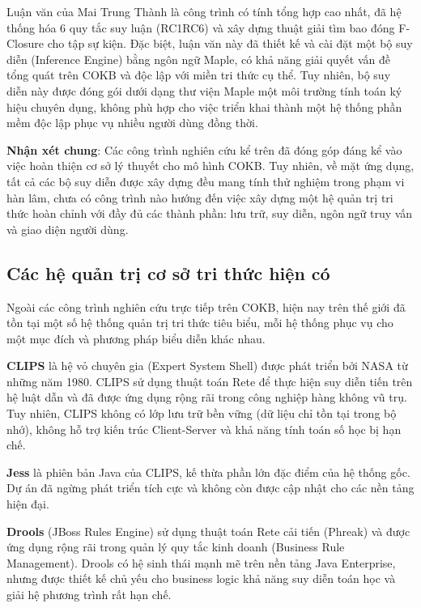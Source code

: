 \documentclass[13pt,a4paper,oneside]{extreport}
\begin{document}
Luận văn của Mai Trung Thành \cite{Dvn_Ijcsi} là công trình có tính tổng hợp cao nhất, đã hệ thống hóa 6 quy tắc suy luận (RC1RC6) và xây dựng thuật giải tìm bao đóng F-Closure cho tập sự kiện. Đặc biệt, luận văn này đã thiết kế và cài đặt một bộ suy diễn (Inference Engine) bằng ngôn ngữ Maple, có khả năng giải quyết vấn đề tổng quát trên COKB và độc lập với miền tri thức cụ thể. Tuy nhiên, bộ suy diễn này được đóng gói dưới dạng thư viện Maple  một môi trường tính toán ký hiệu chuyên dụng, không phù hợp cho việc triển khai thành một hệ thống phần mềm độc lập phục vụ nhiều người dùng đồng thời.


\textbf{Nhận xét chung}: Các công trình nghiên cứu kể trên đã đóng góp đáng kể vào việc hoàn thiện cơ sở lý thuyết cho mô hình COKB. Tuy nhiên, về mặt ứng dụng, tất cả các bộ suy diễn được xây dựng đều mang tính thử nghiệm trong phạm vi hàn lâm, chưa có công trình nào hướng đến việc xây dựng một hệ quản trị tri thức hoàn chỉnh với đầy đủ các thành phần: lưu trữ, suy diễn, ngôn ngữ truy vấn và giao diện người dùng.


\subsection{Các hệ quản trị cơ sở tri thức hiện có}


Ngoài các công trình nghiên cứu trực tiếp trên COKB, hiện nay trên thế giới đã tồn tại một số hệ thống quản trị tri thức tiêu biểu, mỗi hệ thống phục vụ cho một mục đích và phương pháp biểu diễn khác nhau.


\textbf{CLIPS} \cite{CLIPS_Guide} là hệ vỏ chuyên gia (Expert System Shell) được phát triển bởi NASA từ những năm 1980. CLIPS sử dụng thuật toán Rete để thực hiện suy diễn tiến trên hệ luật dẫn và đã được ứng dụng rộng rãi trong công nghiệp hàng không vũ trụ. Tuy nhiên, CLIPS không có lớp lưu trữ bền vững (dữ liệu chỉ tồn tại trong bộ nhớ), không hỗ trợ kiến trúc Client-Server và khả năng tính toán số học bị hạn chế.


\textbf{Jess} \cite{JessInAction} là phiên bản Java của CLIPS, kế thừa phần lớn đặc điểm của hệ thống gốc. Dự án đã ngừng phát triển tích cực và không còn được cập nhật cho các nền tảng hiện đại.


\textbf{Drools} \cite{DroolsDoc} (JBoss Rules Engine) sử dụng thuật toán Rete cải tiến (Phreak) và được ứng dụng rộng rãi trong quản lý quy tắc kinh doanh (Business Rule Management). Drools có hệ sinh thái mạnh mẽ trên nền tảng Java Enterprise, nhưng được thiết kế chủ yếu cho business logic  khả năng suy diễn toán học và giải hệ phương trình rất hạn chế.
\end{document}

